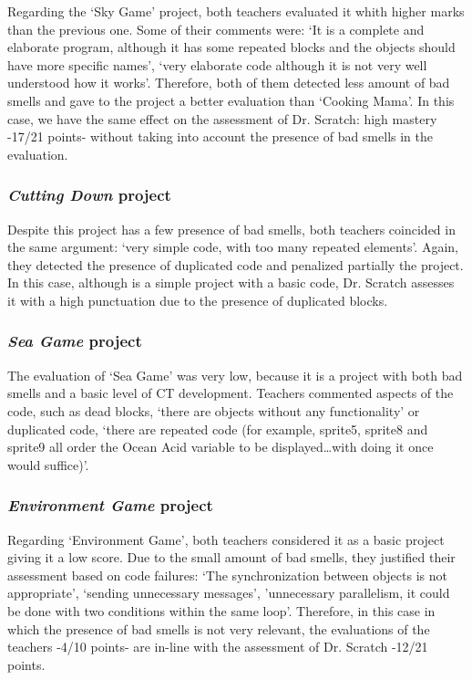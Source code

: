 Regarding the `Sky Game' project, both teachers evaluated it whith higher marks than the previous one. Some of their comments were: `It is a complete and elaborate program, although it has some repeated blocks and the objects should have more specific names', `very elaborate code although it is not very well understood how it works'. Therefore, both of them detected less amount of bad smells and gave to the project a better evaluation than `Cooking Mama'. In this case, we have the same effect on the assessment of Dr. Scratch: high mastery -17/21 points- without taking into account the presence of bad smells in the evaluation.

\subsubsection{\textit{Cutting Down} project}
\label{subsub:cutting_down}

Despite this project has a few presence of bad smells, both teachers coincided in the same argument: `very simple code, with too many repeated elements'. Again, they detected the presence of duplicated code and penalized partially the project. In this case, although is a simple project with a basic code, Dr. Scratch assesses it with a high punctuation due to the presence of duplicated blocks. 

\subsubsection{\textit{Sea Game} project}
\label{subsub:sea_game}

The evaluation of `Sea Game' was very low, because it is a project with both bad smells and a basic level of CT development. Teachers commented aspects of the code, such as dead blocks, `there are objects without any functionality' or duplicated code, `there are repeated code (for example, sprite5, sprite8 and sprite9 all order the Ocean Acid variable to be displayed\ldots with doing it once would suffice)'. 


\subsubsection{\textit{Environment Game} project}
\label{subsub:environment_game}

Regarding `Environment Game', both teachers considered it as a basic project giving it a low score. Due to the small amount of bad smells, they justified their assessment based on code failures: `The synchronization between objects is not appropriate', `sending unnecessary messages', 'unnecessary parallelism, it could be done with two conditions within the same loop'. Therefore, in this case in which the presence of bad smells is not very relevant, the evaluations of the teachers -4/10 points- are in-line with the assessment of Dr. Scratch -12/21 points.


